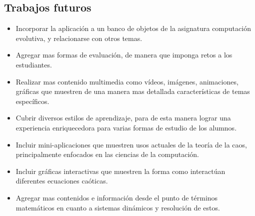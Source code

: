 \documentclass[letterpaper, 11pt, oneside]{article}
\theoremstyle{definition}
\theoremstyle{remark}
\begin{document}
  \subsection{Trabajos futuros}
\begin{itemize}
\item Incorporar la aplicación a un banco de objetos de la asignatura computación evolutiva, y relacionarse con otros temas.
\item Agregar mas formas de evaluación, de manera que imponga retos a los estudiantes.
\item Realizar mas contenido multimedia como vídeos, imágenes, animaciones, gráficas que muestren de una manera mas detallada características de temas específicos.
\item Cubrir diversos estilos de aprendizaje, para de esta manera lograr una experiencia enriquecedora para varias formas de estudio de los alumnos.
\item Incluir mini-aplicaciones que muestren usos actuales de la teoría de la caos, principalmente enfocados en las ciencias de la computación.
\item Incluir gráficas interactivas que muestren la forma como interactúan diferentes ecuaciones caóticas.
\item Agregar mas contenidos e información desde el punto de términos matemáticos en cuanto a sistemas dinámicos y resolución de estos.
\end{itemize}
 
\clearpage


\end{document}
